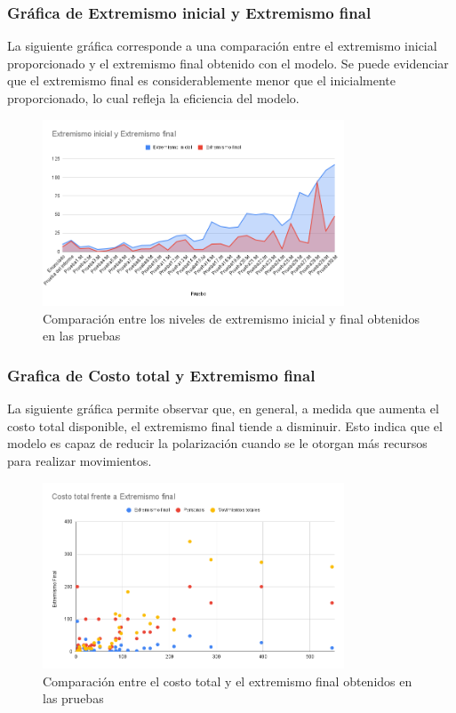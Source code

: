 \documentclass[11pt,letter]{article}
\begin{document}
\subsubsection*{Gráfica de Extremismo inicial y Extremismo final}
La siguiente gráfica corresponde a una comparación entre el extremismo inicial proporcionado y el extremismo final obtenido con el modelo. Se puede evidenciar que el extremismo final es considerablemente menor que el inicialmente proporcionado, lo cual refleja la eficiencia del modelo.
\begin{figure}[H]
    \centering
    \includegraphics[width=0.8\textwidth]{resources/extremismoiyf.png}
    \caption{Comparación entre los niveles de extremismo inicial y final obtenidos en las pruebas}
\end{figure}

\subsubsection*{Grafica de Costo total y Extremismo final}
La siguiente gráfica permite observar que, en general, a medida que aumenta el costo total disponible, el extremismo final tiende a disminuir. Esto indica que el modelo es capaz de reducir la polarización cuando se le otorgan más recursos para realizar movimientos. 

\begin{figure}[H]
    \centering
    \includegraphics[width=0.8\textwidth]{resources/costototalvsextremismofinal.png}
    \caption{Comparación entre el costo total y el extremismo final obtenidos en las pruebas}
\end{figure}
\end{document}
